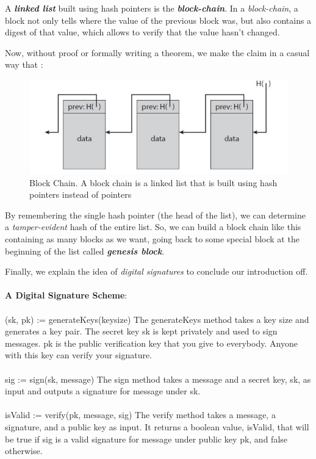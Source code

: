 \documentclass[a4paper, 12pt]{article}
\begin{document}
\begin{tcolorbox}
    A \textbf{\emph{linked list}} built using hash pointers is the \textbf{\emph{block-chain}}. In a \emph{block-chain}, a block not only tells where the value of the previous block was, but also contains a digest of that value, which allows to verify that the value hasn't changed. 
\end{tcolorbox}

Now, without proof or formally writing a theorem, we make the claim in a casual way that : 

\newpage

\begin{figure}[h!]
    \includegraphics[width=0.7\linewidth, scale = 0.6]{linkedlist.png}
    \centering
    \caption{Block Chain. A block chain is a linked list that is built using hash pointers instead of pointers}
    \label{fig:blockchain}
  \end{figure}




\begin{tcolorbox}
    By remembering the single hash pointer (the head of the list), we can determine a \emph{tamper-evident} hash of the entire list. So, we can build a block chain like this containing as many blocks as we want, going back to some special block at the beginning of the list called \textbf{\emph{genesis block}}.
\end{tcolorbox}

Finally, we explain the idea of \emph{digital signatures} to conclude our introduction off. 
\\~\\
\textbf{A Digital Signature Scheme}:
\\
\\
(sk, pk) := generateKeys(keysize) The generateKeys method takes a key size and generates a key pair. The secret key sk is
kept privately and used to sign messages. pk is the public
verification key that you give to everybody. Anyone with this
key can verify your signature.
\\
\\
sig := sign(sk, message) The sign method takes a message and
a secret key, sk, as input and outputs a signature for message
under sk. 
\\
\\
isValid := verify(pk, message, sig) The verify method takes a
message, a signature, and a public key as input. It returns a
boolean value, isValid, that will be true if sig is a valid
signature for message under public key pk, and false otherwise.
\end{document}
